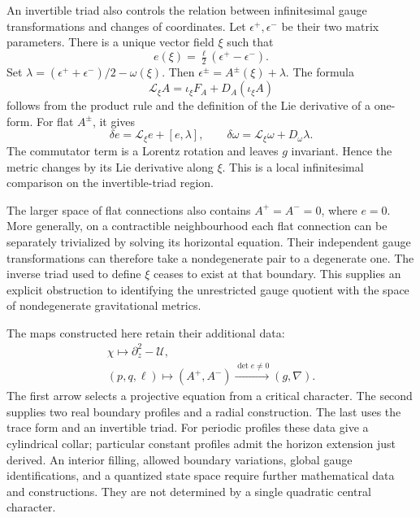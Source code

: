 An invertible triad also controls the relation between infinitesimal gauge transformations and changes of coordinates.
Let $\epsilon^+,\epsilon^-$ be their two matrix parameters.
There is a unique vector field $\xi$ such that
\[
 e(\xi)=\tfrac\ell2(\epsilon^+-\epsilon^-).
\]
Set $\lambda=(\epsilon^++\epsilon^-)/2-\omega(\xi)$.
Then $\epsilon^\pm=A^\pm(\xi)+\lambda$.
The formula
\[
 \mathcal L_\xi A=\iota_\xi F_A+D_A(\iota_\xi A)
\]
follows from the product rule and the definition of the Lie derivative of a one-form.
For flat $A^\pm$, it gives
\[
 \delta e=\mathcal L_\xi e+[e,\lambda],\qquad
 \delta\omega=\mathcal L_\xi\omega+D_\omega\lambda.
\]
The commutator term is a Lorentz rotation and leaves $g$ invariant.
Hence the metric changes by its Lie derivative along $\xi$.
This is a local infinitesimal comparison on the invertible-triad region.

The larger space of flat connections also contains $A^+=A^-=0$, where $e=0$.
More generally, on a contractible neighbourhood each flat connection can be separately trivialized by solving its horizontal equation.
Their independent gauge transformations can therefore take a nondegenerate pair to a degenerate one.
The inverse triad used to define $\xi$ ceases to exist at that boundary.
This supplies an explicit obstruction to identifying the unrestricted gauge quotient with the space of nondegenerate gravitational metrics.

The maps constructed here retain their additional data:
\[
 \begin{gathered}
 \chi\longmapsto \partial_z^2-\mathcal U,\\
 (p,q,\ell)\longmapsto(A^+,A^-)
       \xrightarrow{\det e\ne0}(g,\nabla).
 \end{gathered}
\]
The first arrow selects a projective equation from a critical character.
The second supplies two real boundary profiles and a radial construction.
The last uses the trace form and an invertible triad.
For periodic profiles these data give a cylindrical collar; particular constant profiles admit the horizon extension just derived.
An interior filling, allowed boundary variations, global gauge identifications, and a quantized state space require further mathematical data and constructions.
They are not determined by a single quadratic central character.
